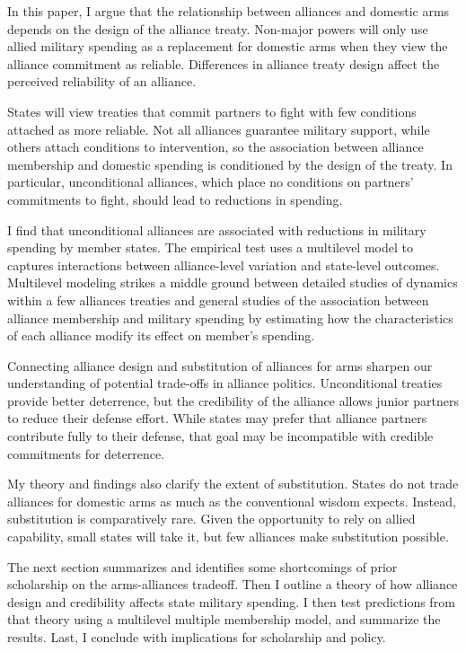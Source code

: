 \documentclass[12pt]{article}
\begin{document}
In this paper, I argue that the relationship between alliances and domestic arms depends on the design of the alliance treaty. Non-major powers will only use allied military spending as a replacement for domestic arms when they view the alliance commitment as reliable. Differences in alliance treaty design affect the perceived reliability of an alliance.

States will view treaties that commit partners to fight with few conditions attached as more reliable. Not all alliances guarantee military support, while others attach conditions to intervention, so the association between alliance membership and domestic spending is conditioned by the design of the treaty. In particular, unconditional alliances, which place no conditions on partners' commitments to fight, should lead to reductions in spending. 

I find that unconditional alliances are associated with reductions in military spending by member states. The empirical test uses a multilevel model to captures interactions between alliance-level variation and state-level outcomes. Multilevel modeling strikes a middle ground between detailed studies of dynamics within a few alliances treaties \citep{Reisinger1983, Hansenetal1990, Chenetal1996, PluemperNeumayer2015} and general studies of the association between alliance membership and military spending \citep{Diehl1994, MorganPalmer2006, QuirozFlores2011, DigiuseppePoast2016} by estimating how the characteristics of each alliance modify its effect on member's spending. 

Connecting alliance design and substitution of alliances for arms sharpen our understanding of potential trade-offs in alliance politics. Unconditional treaties provide better deterrence, but the credibility of the alliance allows junior partners to reduce their defense effort. While states may prefer that alliance partners contribute fully to their defense, that goal may be incompatible with credible commitments for deterrence. 

My theory and findings also clarify the extent of substitution. States do not trade alliances for domestic arms as much as the conventional wisdom expects. Instead, substitution is comparatively rare. Given the opportunity to rely on allied capability, small states will take it, but few alliances make substitution possible.   

The next section summarizes and identifies some shortcomings of prior scholarship on the arms-alliances tradeoff. Then I outline a theory of how alliance design and credibility affects state military spending. I then test predictions from that theory using a multilevel multiple membership model, and summarize the results. Last, I conclude with implications for scholarship and policy.  
\end{document}
